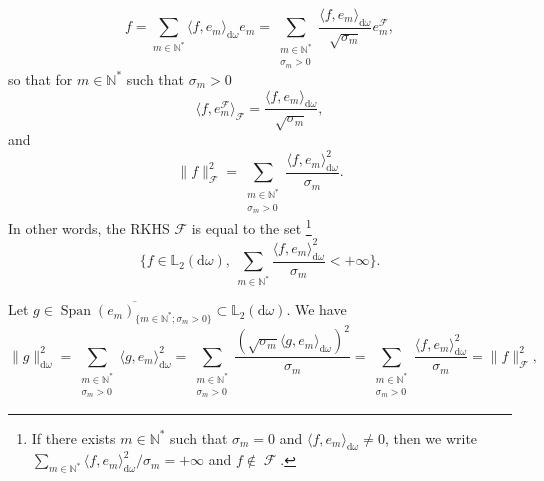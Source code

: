 \documentclass[twoside,11pt]{book}
\numberwithin{theorem}{chapter}
\numberwithin{definition}{chapter}
\numberwithin{proposition}{chapter}
\numberwithin{corollary}{chapter}
\numberwithin{example}{chapter}
\numberwithin{lemma}{chapter}
\numberwithin{assumption}{chapter}
\numberwithin{equation}{chapter}
\numberwithin{figure}{chapter}
\DeclareMathOperator{\Span}{\mathrm{Span}}
\DeclareMathOperator{\F}{\mathcal{F}}
\begin{document}
\begin{equation}
f  = \sum\limits_{m \in \mathbb{N}^{*}} \langle f, e_m \rangle_{\mathrm{d}\omega} e_m =  \sum\limits_{\substack{m \in \mathbb{N}^{*}\\ \sigma_m >0}} \frac{\langle f, e_m \rangle_{\mathrm{d}\omega}}{\sqrt{\sigma_m}} e_{m}^{\F},
\end{equation}
so that for $m \in \mathbb{N}^{*}$ such that $\sigma_m>0$
\begin{equation}
 \langle f, e_{m}^{\F} \rangle_{\F} = \frac{\langle f,e_m \rangle_{\mathrm{d}\omega}}{\sqrt{\sigma_m}}, 
\end{equation}
and
\begin{equation}\label{eq:rkhs_norm_ltwo_norm}
\|f\|_{\F}^{2} = \sum\limits_{\substack{m \in \mathbb{N}^{*}\\\sigma_m >0}} \frac{\langle f, e_m \rangle_{\mathrm{d}\omega}^{2}}{\sigma_m}.
\end{equation}
In other words, the RKHS $\mathcal{F}$ is equal to the set \footnote{If there exists $m \in \mathbb{N}^{*}$ such that $\sigma_m = 0$ and $\langle f, e_m \rangle_{\mathrm{d}\omega} \neq 0$, then we write $\sum\limits_{m \in \mathbb{N}^{*}} \langle f,e_m \rangle_{\mathrm{d}\omega}^{2}/\sigma_m = +\infty$ and $f \notin \F$.}
\begin{equation}
\bigg \{ f \in \mathbb{L}_{2}(\mathrm{d}\omega), \: \sum\limits_{m \in \mathbb{N}^{*}} \frac{\langle f,e_m \rangle_{\mathrm{d}\omega}^{2}}{\sigma_m} < +\infty \bigg\}.
\end{equation}



Let $g \in \overline{\Span (e_{m})_{\{m \in \mathbb{N}^{*}; \sigma_m>0 \}}} \subset \mathbb{L}_{2}(\mathrm{d}\omega)$. We have
\begin{equation}
\|g\|_{\mathrm{d}\omega}^{2} = \sum\limits_{\substack{m \in \mathbb{N}^{*}\\ \sigma_{m}>0}}\langle g,e_{m}\rangle_{\mathrm{d}\omega}^{2} = \sum\limits_{\substack{m \in \mathbb{N}^{*}\\ \sigma_{m}>0}} \frac{(\sqrt{\sigma_m} \langle g,e_{m}\rangle_{\mathrm{d}\omega})^{2}}{\sigma_{m}}= \sum\limits_{\substack{m \in \mathbb{N}^{*}\\ \sigma_{m}>0}} \frac{ \langle f,e_{m}\rangle_{\mathrm{d}\omega}^{2}}{\sigma_{m}} = \|f\|_{\F}^{2}, 
\end{equation}
\end{document}
